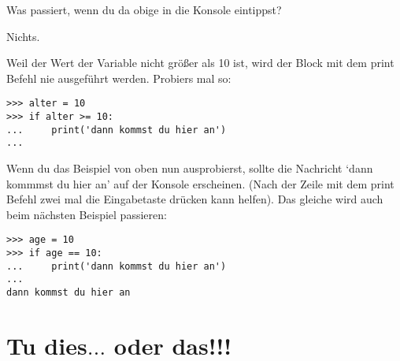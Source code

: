 \noindent
Was passiert, wenn du da obige in die Konsole eintippst?
\par
\noindent
Nichts.
\par
\noindent
Weil der Wert der Variable  nicht größer als 10 ist, wird der Block mit dem print Befehl nie ausgeführt werden. Probiers mal so:

\begin{Verbatim}[frame=single]
>>> alter = 10
>>> if alter >= 10:
...     print('dann kommst du hier an')
...
\end{Verbatim}

Wenn du das Beispiel von oben nun ausprobierst, sollte die Nachricht `dann kommmst du hier an' auf der Konsole erscheinen. (Nach der Zeile mit dem print Befehl zwei mal die Eingabetaste drücken kann helfen). Das gleiche wird auch beim nächsten Beispiel passieren:

\begin{Verbatim}[frame=single]
>>> age = 10
>>> if age == 10:
...     print('dann kommst du hier an')
...
dann kommst du hier an
\end{Verbatim}

\section{Tu dies$\ldots$ oder das!!!}

